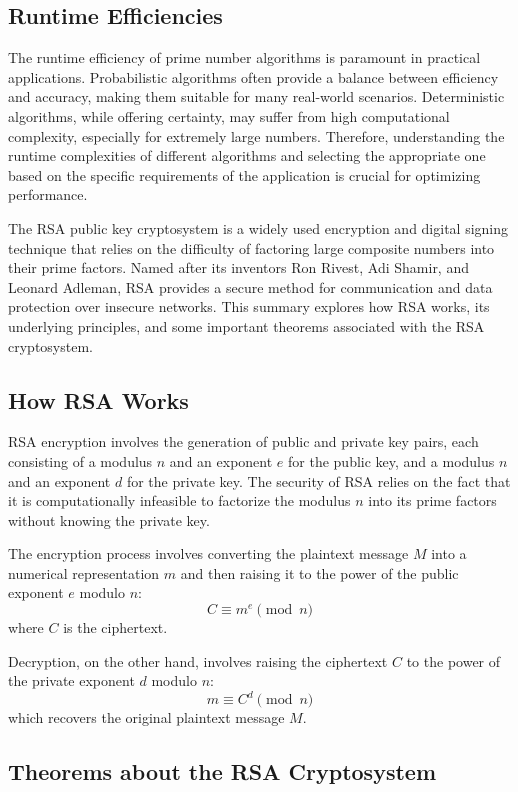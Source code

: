 \documentclass{article}
\renewcommand{\_}{\ifincsname_\else\legacyunderscore\fi}
\begin{document}
\subsection{Runtime Efficiencies}
The runtime efficiency of prime number algorithms is paramount in practical applications. Probabilistic algorithms often provide a balance between efficiency and accuracy, making them suitable for many real-world scenarios. Deterministic algorithms, while offering certainty, may suffer from high computational complexity, especially for extremely large numbers. Therefore, understanding the runtime complexities of different algorithms and selecting the appropriate one based on the specific requirements of the application is crucial for optimizing performance.

The RSA public key cryptosystem is a widely used encryption and digital signing technique that relies on the difficulty of factoring large composite numbers into their prime factors. Named after its inventors Ron Rivest, Adi Shamir, and Leonard Adleman, RSA provides a secure method for communication and data protection over insecure networks. This summary explores how RSA works, its underlying principles, and some important theorems associated with the RSA cryptosystem.

\subsection{How RSA Works}

RSA encryption involves the generation of public and private key pairs, each consisting of a modulus \(n\) and an exponent \(e\) for the public key, and a modulus \(n\) and an exponent \(d\) for the private key. The security of RSA relies on the fact that it is computationally infeasible to factorize the modulus \(n\) into its prime factors without knowing the private key.

The encryption process involves converting the plaintext message \(M\) into a numerical representation \(m\) and then raising it to the power of the public exponent \(e\) modulo \(n\):
\[ C \equiv m^e \pmod{n} \]
where \(C\) is the ciphertext.

Decryption, on the other hand, involves raising the ciphertext \(C\) to the power of the private exponent \(d\) modulo \(n\):
\[ m \equiv C^d \pmod{n} \]
which recovers the original plaintext message \(M\).

\subsection{Theorems about the RSA Cryptosystem}
\end{document}
